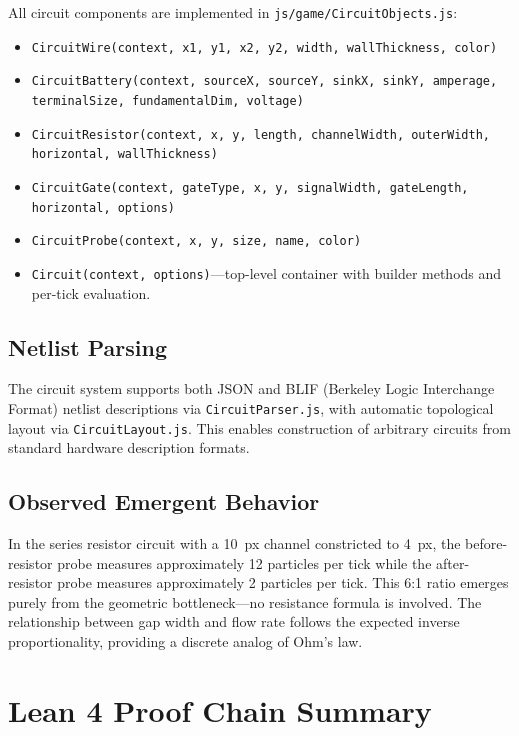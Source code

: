 \documentclass[11pt,a4paper]{article}
\begin{document}
All circuit components are implemented in \texttt{js/game/CircuitObjects.js}:

\begin{itemize}
    \item \texttt{CircuitWire(context, x1, y1, x2, y2, width, wallThickness, color)}
    \item \texttt{CircuitBattery(context, sourceX, sourceY, sinkX, sinkY, amperage, terminalSize, fundamentalDim, voltage)}
    \item \texttt{CircuitResistor(context, x, y, length, channelWidth, outerWidth, horizontal, wallThickness)}
    \item \texttt{CircuitGate(context, gateType, x, y, signalWidth, gateLength, horizontal, options)}
    \item \texttt{CircuitProbe(context, x, y, size, name, color)}
    \item \texttt{Circuit(context, options)}---top-level container with builder methods and per-tick evaluation.
\end{itemize}

\subsection{Netlist Parsing}

The circuit system supports both JSON and BLIF (Berkeley Logic Interchange Format) netlist descriptions via \texttt{CircuitParser.js}, with automatic topological layout via \texttt{CircuitLayout.js}. This enables construction of arbitrary circuits from standard hardware description formats.

\subsection{Observed Emergent Behavior}

In the series resistor circuit with a 10~px channel constricted to 4~px, the before-resistor probe measures approximately 12 particles per tick while the after-resistor probe measures approximately 2 particles per tick. This 6:1 ratio emerges purely from the geometric bottleneck---no resistance formula is involved. The relationship between gap width and flow rate follows the expected inverse proportionality, providing a discrete analog of Ohm's law.


\section{Lean 4 Proof Chain Summary}
\label{app:lean}
\end{document}
